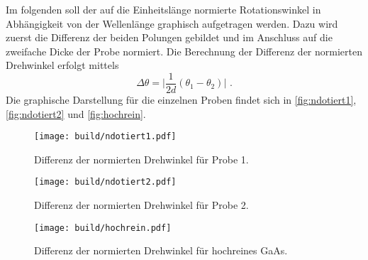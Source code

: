 Im folgenden soll der auf die Einheitslänge normierte Rotationswinkel in Abhängigkeit von der Wellenlänge graphisch aufgetragen werden. Dazu 
wird zuerst die Differenz der beiden Polungen gebildet und im Anschluss auf die zweifache Dicke der Probe normiert. 
Die Berechnung der Differenz der normierten Drehwinkel erfolgt mittels
\begin{equation*}
    \Delta \theta = \lvert \frac{1}{2d}(\theta_1 - \theta_2) \rvert \,\, .
\end{equation*}
Die graphische Darstellung für die einzelnen Proben findet sich in \autoref{fig:ndotiert1}, \autoref{fig:ndotiert2} und \autoref{fig:hochrein}.
\begin{figure}[H]
    \centering
    \texttt{[image: build/ndotiert1.pdf]}
    \caption{Differenz der normierten Drehwinkel für Probe 1.}
    \label{fig:ndotiert1}
\end{figure}

\begin{figure}[H]
    \centering
    \texttt{[image: build/ndotiert2.pdf]}
    \caption{Differenz der normierten Drehwinkel für Probe 2.}
    \label{fig:ndotiert2}
\end{figure}

\begin{figure}[H]
    \centering
    \texttt{[image: build/hochrein.pdf]}
    \caption{Differenz der normierten Drehwinkel für hochreines GaAs.}
    \label{fig:hochrein}
\end{figure}

